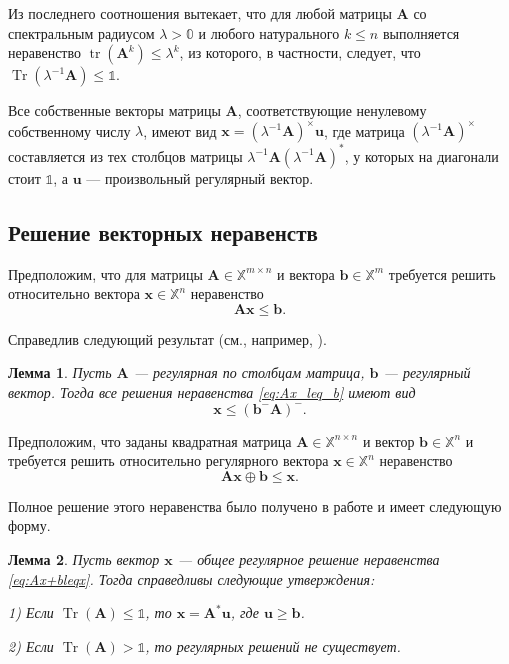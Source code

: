 \documentclass[specialist,
               substylefile = spbu.rtx,
               subf,href,colorlinks=true, 12pt]{disser}
\newtheorem{lemma}{Лемма}
\DeclareMathOperator{\tr}{tr}
\DeclareMathOperator{\Tr}{Tr}
\theoremstyle{definition}
\begin{document}
Из последнего соотношения вытекает, что для любой матрицы $\bm{A}$ со спектральным радиусом $\lambda>\mathbb{0}$ и любого натурального $k\leq n$ выполняется неравенство
$\tr(\bm{A}^{k})\leq\lambda^{k}$, из которого, в частности, следует, что $\Tr(\lambda^{-1}\bm{A})\leq\mathbb{1}$.

Все собственные векторы матрицы $\bm{A}$, соответствующие ненулевому собственному числу $\lambda$, имеют вид $\bm{x}=(\lambda^{-1}\bm{A})^{\times}\bm{u}$, где матрица $(\lambda^{-1}\bm{A})^{\times}$ составляется из тех столбцов матрицы $\lambda^{-1}\bm{A}(\lambda^{-1}\bm{A})^{\ast}$, у которых на диагонали стоит $\mathbb{1}$, а $\bm{u}$ --- произвольный регулярный вектор.

\subsection{Решение векторных неравенств}
Предположим, что для матрицы $\bm{A}\in\mathbb{X}^{m\times n}$ и вектора $\bm{b}\in\mathbb{X}^{m}$ требуется решить относительно вектора $\bm{x}\in\mathbb{X}^{n}$ неравенство
\begin{equation}\label{eq:Ax_leq_b}
\bm{A}\bm{x}
\leq
\bm{b}.
\end{equation}

Справедлив следующий результат (см., например, \cite{Krivulin2009Methods}).
\begin{lemma}
\label{lem:Cx_leq_d}
Пусть $\bm{A}$ --- регулярная по столбцам матрица, $\bm{b}$ --- регулярный вектор. Тогда все решения неравенства \eqref{eq:Ax_leq_b} имеют вид 
\begin{equation*}
\bm{x}
\leq
(\bm{b}^{-}\bm{A})^{-}.
\end{equation*}
\end{lemma}

Предположим, что заданы квадратная матрица  $\bm{A}\in\mathbb{X}^{n\times n}$ и вектор $\bm{b}\in\mathbb{X}^{n}$ и требуется решить относительно регулярного вектора $\bm{x}\in\mathbb{X}^{n}$ неравенство
\begin{equation}\label{eq:Ax+bleqx}
\bm{A}\bm{x}\oplus\bm{b}
\leq\bm{x}.
\end{equation}

Полное решение этого неравенства было получено в работе \cite{Krivulin2015Multidimensional} и имеет следующую форму.
\begin{lemma}\label{lem:Ax+bleqx}
Пусть вектор $\bm{x}$ --- общее регулярное решение неравенства \eqref{eq:Ax+bleqx}. Тогда справедливы следующие утверждения:

1) Если $\Tr(\bm{A})\leq\mathbb{1}$, то $\bm{x}=\bm{A}^{\ast}\bm{u}$, где $\bm{u}\geq\bm{b}$.

2) Если $\Tr(\bm{A})>\mathbb{1}$, то регулярных решений не существует.
\end{lemma}
\end{document}
